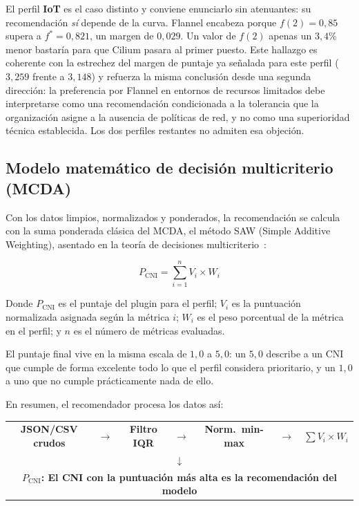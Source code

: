 El perfil \textbf{IoT} es el caso distinto y conviene enunciarlo sin atenuantes: su recomendación \emph{sí} depende de la curva. Flannel encabeza porque $f(2)=0{,}85$ supera a $f^{*}=0{,}821$, un margen de $0{,}029$. Un valor de $f(2)$ apenas un $3{,}4\%$ menor bastaría para que Cilium pasara al primer puesto. Este hallazgo es coherente con la estrechez del margen de puntaje ya señalada para este perfil ($3{,}259$ frente a $3{,}148$) y refuerza la misma conclusión desde una segunda dirección: la preferencia por Flannel en entornos de recursos limitados debe interpretarse como una recomendación condicionada a la tolerancia que la organización asigne a la ausencia de políticas de red, y no como una superioridad técnica establecida. Los dos perfiles restantes no admiten esa objeción.

\subsection{Modelo matemático de decisión multicriterio (MCDA)} \label{sec:apb_mcda}

Con los datos limpios, normalizados y ponderados, la recomendación se calcula con la suma ponderada clásica del MCDA, el método SAW (Simple Additive Weighting), asentado en la teoría de decisiones multicriterio~\cite{ref34,ref37}:

\begin{equation}
  P_{\text{CNI}} = \sum_{i=1}^{n} V_i \times W_i
  \label{eq:mcda-suma-app}
\end{equation}

Donde $P_{\text{CNI}}$ es el puntaje del plugin para el perfil; $V_i$ es la puntuación normalizada asignada según la métrica $i$; $W_i$ es el peso porcentual de la métrica en el perfil; y $n$ es el número de métricas evaluadas. 

El puntaje final vive en la misma escala de $1,0$ a $5,0$: un $5,0$ describe a un CNI que cumple de forma excelente todo lo que el perfil considera prioritario, y un $1,0$ a uno que no cumple prácticamente nada de ello.

En resumen, el recomendador procesa los datos así:

\begin{center}
  \begin{tabular}{ccccccc}
    \colorbox{oe3azulcl}{\small\textbf{JSON/CSV crudos}} &
    $\rightarrow$ &
    \colorbox{oe3griscl}{\small\textbf{Filtro IQR}} &
    $\rightarrow$ &
    \colorbox{oe3griscl}{\small\textbf{Norm.\ min-max}} &
    $\rightarrow$ &
    \colorbox{oe3verdecl}{\small\textbf{$\sum V_i \times W_i$}} \\[6pt]
    \multicolumn{7}{c}{$\downarrow$} \\[4pt]
    \multicolumn{7}{c}{\colorbox{oe3azulcl}{\small\textbf{$P_{\text{CNI}}$: El CNI con la puntuación más alta es la recomendación del modelo}}}
  \end{tabular}
\end{center}


